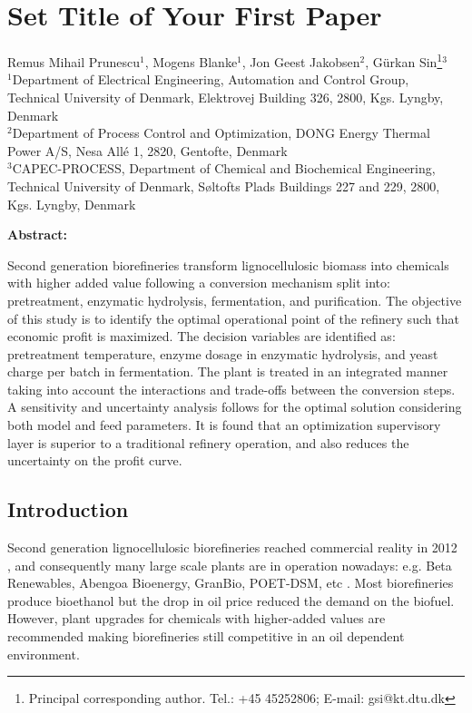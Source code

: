 \chapter{Set Title of Your First Paper}
\renewcommand{\folder}{publications/a}
\graphicspath{{\folder/gfx/}}


\begin{raggedright}
	\renewcommand*{\thefootnote}{*}
	Remus Mihail Prunescu$^1$, Mogens Blanke$^1$, Jon Geest Jakobsen$^2$, Gürkan Sin\footnote{Principal corresponding author. Tel.: +45 45252806; E-mail: gsi@kt.dtu.dk}$^3$\\[2em]
	$^1$Department of Electrical Engineering, Automation and Control Group, Technical University of Denmark, Elektrovej Building 326, 2800, Kgs. Lyngby, Denmark\\[.5em]
	$^2$Department of Process Control and Optimization, DONG Energy Thermal Power A/S, Nesa Allé 1, 2820, Gentofte, Denmark\\[.5em]
	$^3$CAPEC-PROCESS, Department of Chemical and Biochemical Engineering, Technical University of Denmark, Søltofts Plads Buildings 227 and 229, 2800, Kgs. Lyngby, Denmark
	\renewcommand*{\thefootnote}{\arabic{footnote}}
\end{raggedright}

\vfill
{\noindent\bfseries Abstract:}

\noindent Second generation biorefineries transform lignocellulosic biomass into chemicals with higher added value following a conversion mechanism split into: pretreatment, enzymatic hydrolysis, fermentation, and purification. The objective of this study is to identify the optimal operational point of the refinery such that economic profit is maximized. The decision variables are identified as: pretreatment temperature, enzyme dosage in enzymatic hydrolysis, and yeast charge per batch in fermentation. The plant is treated in an integrated manner taking into account the interactions and trade-offs between the conversion steps. A sensitivity and uncertainty analysis follows for the optimal solution considering both model and feed parameters. It is found that an optimization supervisory layer is superior to a traditional refinery operation, and also reduces the uncertainty on the profit curve.

\vfill

\newpage
\section{Introduction}
Second generation lignocellulosic biorefineries reached commercial reality in 2012 \citep{Larsen2012}, and consequently many large scale plants are in operation nowadays: e.g. Beta Renewables, Abengoa Bioenergy, GranBio, POET-DSM, etc \citep{Brown2015}. Most biorefineries produce bioethanol but the drop in oil price reduced the demand on the biofuel. However, plant upgrades for chemicals with higher-added values are recommended \citep{Cheali2015} making biorefineries still competitive in an oil dependent environment.